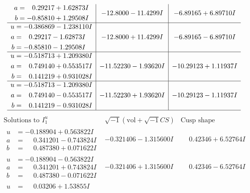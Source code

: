 \documentclass[1p]{elsarticle_modified}
\theoremstyle{definition}
\newcommand{\I}{\sqrt{-1}}
\begin{document}
$$\begin{array}{c|c|c}
\begin{aligned}
a &= \phantom{-}0.29217 + 1.62873 I \\
b &= -0.85810 + 1.29508 I\end{aligned}
 & -12.8000 - 11.4299 I & -6.89165 + 6.89710 I \\ \hline\begin{aligned}
u &= -0.386869 - 1.238110 I \\
a &= \phantom{-}0.29217 - 1.62873 I \\
b &= -0.85810 - 1.29508 I\end{aligned}
 & -12.8000 + 11.4299 I & -6.89165 - 6.89710 I \\ \hline\begin{aligned}
u &= -0.518713 + 1.209380 I \\
a &= \phantom{-}0.749140 + 0.553517 I \\
b &= \phantom{-}0.141219 + 0.931028 I\end{aligned}
 & -11.52230 - 1.93620 I & -10.29123 + 1.11937 I \\ \hline\begin{aligned}
u &= -0.518713 - 1.209380 I \\
a &= \phantom{-}0.749140 - 0.553517 I \\
b &= \phantom{-}0.141219 - 0.931028 I\end{aligned}
 & -11.52230 + 1.93620 I & -10.29123 - 1.11937 I\\
 \hline 
 \end{array}$$\newpage$$\begin{array}{c|c|c}  
\text{Solutions to }I^u_{1}& \I (\text{vol} + \sqrt{-1}CS) & \text{Cusp shape}\\
 \hline 
\begin{aligned}
u &= -0.188904 + 0.563822 I \\
a &= \phantom{-}0.341201 - 0.743824 I \\
b &= \phantom{-}0.487380 + 0.071622 I\end{aligned}
 & -0.321406 - 1.315600 I & \phantom{-}0.42346 + 6.52764 I \\ \hline\begin{aligned}
u &= -0.188904 - 0.563822 I \\
a &= \phantom{-}0.341201 + 0.743824 I \\
b &= \phantom{-}0.487380 - 0.071622 I\end{aligned}
 & -0.321406 + 1.315600 I & \phantom{-}0.42346 - 6.52764 I \\ \hline\begin{aligned}
u &= \phantom{-}0.03206 + 1.53855 I \\

\end{aligned}
\end{array}$$
\end{document}
